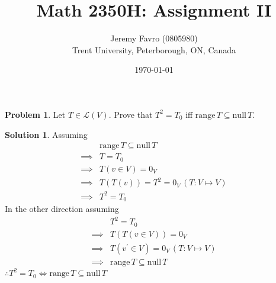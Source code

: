 \documentclass[10pt]{article}
\title{Math 2350H: Assignment II}
\author{Jeremy Favro (0805980) \\ Trent University, Peterborough, ON, Canada}
\date{\today}
\theoremstyle{definition}
\newtheorem{problem}{Problem}
\newtheorem{soln}{Solution}
\begin{document}
\maketitle

\begin{problem}
Let $T\in\mathcal{L}(V)$. Prove that $T^2=T_0$ iff $\mathrm{range}\,T\subseteq\mathrm{null}\,T$.
\end{problem}
\begin{soln}
  Assuming
  \begin{align*}
             & \mathrm{range}\,T\subseteq\mathrm{null}\,T \\
    \implies & T=T_0                                      \\
    \implies & T(v\in V)=0_V                              \\
    \implies & T(T(v))=T^2=0_V\, (T:V\mapsto V)           \\
    \implies & T^2=T_0
  \end{align*}
  In the other direction assuming
  \begin{align*}
             & T^2=T_0                                    \\
    \implies & T(T(v\in V))=0_V                           \\
    \implies & T(v^\prime \in V)=0_V \, (T:V\mapsto V)    \\
    \implies & \mathrm{range}\,T\subseteq\mathrm{null}\,T
  \end{align*}
  $\therefore T^2=T_0\iff \mathrm{range}\,T\subseteq\mathrm{null}\,T$
\end{soln}
\end{document}

